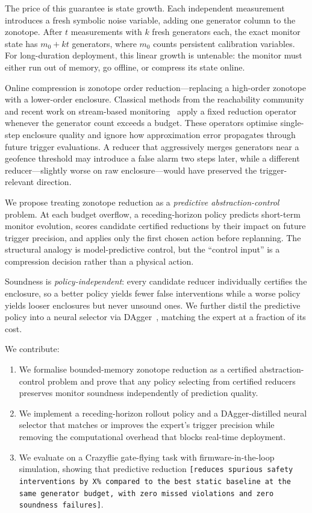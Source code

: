 \documentclass{article}
\newcommand{\placeholder}[1]{\texttt{[#1]}}
\begin{document}
The price of this guarantee is state growth.
Each independent measurement introduces a fresh symbolic noise variable, adding one generator column to the zonotope.
After $t$ measurements with $k$ fresh generators each, the exact monitor state has $m_0 + kt$ generators, where $m_0$ counts persistent calibration variables.
For long-duration deployment, this linear growth is untenable: the monitor must either run out of memory, go offline, or compress its state online.

Online compression is zonotope order reduction---replacing a high-order zonotope with a lower-order enclosure.
Classical methods from the reachability community~\cite{Girard2005, Kopetzki2017, YangScott2018} and recent work on stream-based monitoring~\cite{Finkbeiner2025} apply a fixed reduction operator whenever the generator count exceeds a budget.
These operators optimise single-step enclosure quality and ignore how approximation error propagates through future trigger evaluations.
A reducer that aggressively merges generators near a geofence threshold may introduce a false alarm two steps later, while a different reducer---slightly worse on raw enclosure---would have preserved the trigger-relevant direction.

We propose treating zonotope reduction as a \emph{predictive abstraction-control} problem.
At each budget overflow, a receding-horizon policy predicts short-term monitor evolution, scores candidate certified reductions by their impact on future trigger precision, and applies only the first chosen action before replanning.
The structural analogy is model-predictive control, but the ``control input'' is a compression decision rather than a physical action.

Soundness is \emph{policy-independent}: every candidate reducer individually certifies the enclosure, so a better policy yields fewer false interventions while a worse policy yields looser enclosures but never unsound ones.
We further distil the predictive policy into a neural selector via DAgger~\cite{Ross2011}, matching the expert at a fraction of its cost.

We contribute:
\begin{enumerate}
\item We formalise bounded-memory zonotope reduction as a certified abstraction-control problem and prove that any policy selecting from certified reducers preserves monitor soundness independently of prediction quality.
\item We implement a receding-horizon rollout policy and a DAgger-distilled neural selector that matches or improves the expert's trigger precision while removing the computational overhead that blocks real-time deployment.
\item We evaluate on a Crazyflie gate-flying task with firmware-in-the-loop simulation, showing that predictive reduction \placeholder{reduces spurious safety interventions by X\% compared to the best static baseline at the same generator budget, with zero missed violations and zero soundness failures}.
\end{enumerate}
\end{document}
